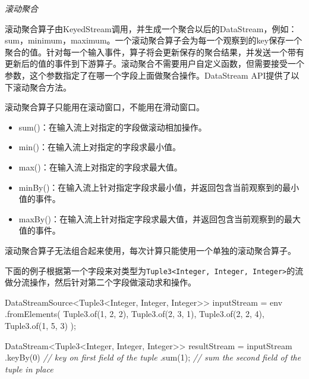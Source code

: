 \documentclass[cn,11pt,chinese]{elegantbook}
\newenvironment{Shaded}{}{}
\newcommand{\BuiltInTok}[1]{#1}
\newcommand{\CommentTok}[1]{\textcolor[rgb]{0.38,0.63,0.69}{\textit{#1}}}
\newcommand{\DecValTok}[1]{\textcolor[rgb]{0.25,0.63,0.44}{#1}}
\newcommand{\FunctionTok}[1]{\textcolor[rgb]{0.02,0.16,0.49}{#1}}
\newcommand{\NormalTok}[1]{#1}
\providecommand{\tightlist}{%
  \setlength{\itemsep}{0pt}\setlength{\parskip}{0pt}}
\renewenvironment{quote}{\begin{customblockquote}\list{}{\rightmargin=0em\leftmargin=0em}%
\item\relax\color{blockquote-text}\ignorespaces}{\unskip\unskip\endlist\end{customblockquote}}
\begin{document}
\emph{滚动聚合}

滚动聚合算子由KeyedStream调用，并生成一个聚合以后的DataStream，例如：sum，minimum，maximum。一个滚动聚合算子会为每一个观察到的key保存一个聚合的值。针对每一个输入事件，算子将会更新保存的聚合结果，并发送一个带有更新后的值的事件到下游算子。滚动聚合不需要用户自定义函数，但需要接受一个参数，这个参数指定了在哪一个字段上面做聚合操作。DataStream
API提供了以下滚动聚合方法。

\begin{quote}
滚动聚合算子只能用在滚动窗口，不能用在滑动窗口。
\end{quote}

\begin{itemize}
\tightlist
\item
  sum()：在输入流上对指定的字段做滚动相加操作。
\item
  min()：在输入流上对指定的字段求最小值。
\item
  max()：在输入流上对指定的字段求最大值。
\item
  minBy()：在输入流上针对指定字段求最小值，并返回包含当前观察到的最小值的事件。
\item
  maxBy()：在输入流上针对指定字段求最大值，并返回包含当前观察到的最大值的事件。
\end{itemize}

滚动聚合算子无法组合起来使用，每次计算只能使用一个单独的滚动聚合算子。

下面的例子根据第一个字段来对类型为\texttt{Tuple3\textless{}Integer,\ Integer,\ Integer\textgreater{}}的流做分流操作，然后针对第二个字段做滚动求和操作。

\begin{Shaded}
\begin{Highlighting}[]
\NormalTok{DataStreamSource\textless{}Tuple3\textless{}}\BuiltInTok{Integer}\NormalTok{, }\BuiltInTok{Integer}\NormalTok{, }\BuiltInTok{Integer}\NormalTok{\textgreater{}\textgreater{} inputStream = env}
\NormalTok{    .}\FunctionTok{fromElements}\NormalTok{(}
\NormalTok{        Tuple3.}\FunctionTok{of}\NormalTok{(}\DecValTok{1}\NormalTok{, }\DecValTok{2}\NormalTok{, }\DecValTok{2}\NormalTok{),}
\NormalTok{        Tuple3.}\FunctionTok{of}\NormalTok{(}\DecValTok{2}\NormalTok{, }\DecValTok{3}\NormalTok{, }\DecValTok{1}\NormalTok{),}
\NormalTok{        Tuple3.}\FunctionTok{of}\NormalTok{(}\DecValTok{2}\NormalTok{, }\DecValTok{2}\NormalTok{, }\DecValTok{4}\NormalTok{),}
\NormalTok{        Tuple3.}\FunctionTok{of}\NormalTok{(}\DecValTok{1}\NormalTok{, }\DecValTok{5}\NormalTok{, }\DecValTok{3}\NormalTok{)}
\NormalTok{    );}

\NormalTok{DataStream\textless{}Tuple3\textless{}}\BuiltInTok{Integer}\NormalTok{, }\BuiltInTok{Integer}\NormalTok{, }\BuiltInTok{Integer}\NormalTok{\textgreater{}\textgreater{} resultStream = inputStream}
\NormalTok{  .}\FunctionTok{keyBy}\NormalTok{(}\DecValTok{0}\NormalTok{) }\CommentTok{// key on first field of the tuple}
\NormalTok{  .}\FunctionTok{sum}\NormalTok{(}\DecValTok{1}\NormalTok{);   }\CommentTok{// sum the second field of the tuple in place}
\end{Highlighting}
\end{Shaded}
\end{document}
